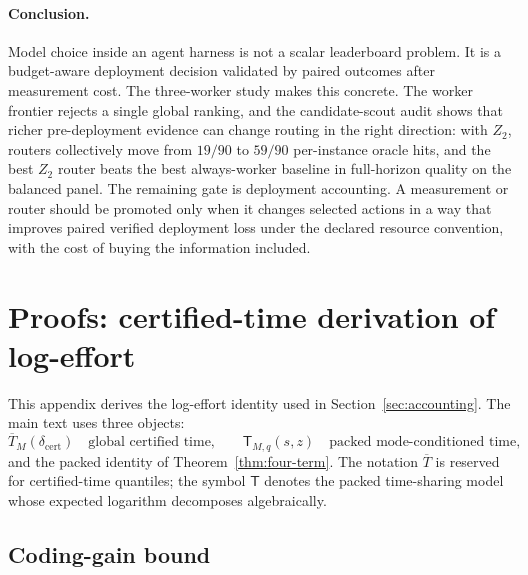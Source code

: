 \documentclass{article}
\begin{document}
\paragraph{Conclusion.}
Model choice inside an agent harness is not a scalar leaderboard problem.
It is a budget-aware deployment decision validated by paired outcomes after measurement cost.
The three-worker study makes this concrete.
The worker frontier rejects a single global ranking, and the candidate-scout audit shows that richer pre-deployment evidence can change routing in the right direction: with \(Z_2\), routers collectively move from \(19/90\) to \(59/90\) per-instance oracle hits, and the best \(Z_2\) router beats the best always-worker baseline in full-horizon quality on the balanced panel.
The remaining gate is deployment accounting.
A measurement or router should be promoted only when it changes selected actions in a way that improves paired verified deployment loss under the declared resource convention, with the cost of buying the information included.

\clearpage



\clearpage

\appendix



\clearpage
\section{Proofs: certified-time derivation of log-effort}
\label{app:proofs}
\label{app:certified-log-effort}
\label{app:proofs}

This appendix derives the log-effort identity used in Section~\ref{sec:accounting}.
The main text uses three objects:
\[
    \overline T_M(\delta_{\mathrm{cert}})
    \quad\text{global certified time,}
    \qquad
    \mathsf T_{M,q}(s,z)
    \quad\text{packed mode-conditioned time,}
\]
and the packed identity of Theorem~\ref{thm:four-term}.
The notation \(\overline T\) is reserved for certified-time quantiles; the symbol
\(\mathsf T\) denotes the packed time-sharing model whose expected logarithm decomposes
algebraically.

\subsection{Coding-gain bound}
\end{document}
